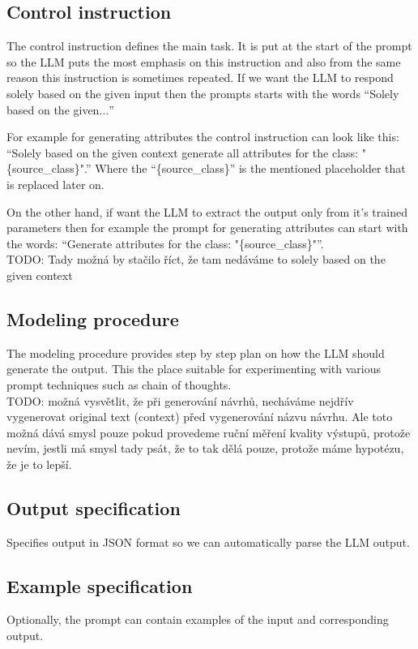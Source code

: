 \subsection{Control instruction}
The control instruction defines the main task. It is put at the start of the prompt so the LLM puts the most emphasis on this instruction and also from the same reason this instruction is sometimes repeated. If we want the LLM to respond solely based on the given input then the prompts starts with the words ``Solely based on the given$\ldots$''

For example for generating attributes the control instruction can look like this:
``Solely based on the given context generate all attributes for the class: "\{source\_class\}".'' Where the ``\{source\_class\}'' is the mentioned placeholder that is replaced later on.

On the other hand, if want the LLM to extract the output only from it's trained parameters then for example the prompt for generating attributes can start with the words: ``Generate attributes for the class: "\{source\_class\}"''. \\

TODO: Tady možná by stačilo říct, že tam nedáváme to solely based on the given context \\


\subsection{Modeling procedure}
The modeling procedure provides step by step plan on how the LLM should generate the output. This the place suitable for experimenting with various prompt techniques such as chain of thoughts. \\

TODO: možná vysvětlit, že při generování návrhů, necháváme nejdřív vygenerovat original text (context) před vygenerování názvu návrhu. Ale toto možná dává smysl pouze pokud provedeme ruční měření kvality výstupů, protože nevím, jestli má smysl tady psát, že to tak dělá pouze, protože máme hypotézu, že je to lepší.


\subsection{Output specification}
Specifies output in JSON format so we can automatically parse the LLM output.


\subsection{Example specification}
Optionally, the prompt can contain examples of the input and corresponding output.



